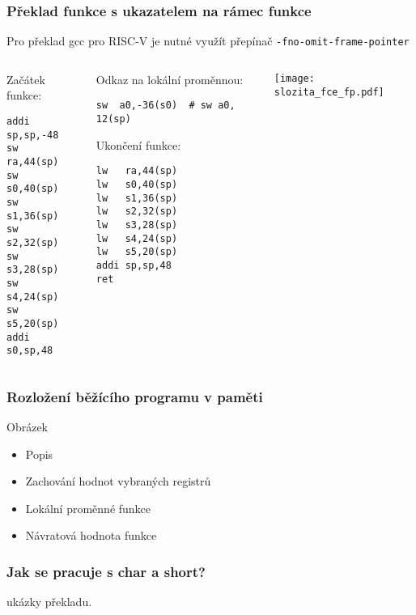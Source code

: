 \documentclass{beamer}
\begin{document}
\begin{frame}[fragile,shrink=5]
\frametitle{Překlad funkce s ukazatelem na rámec funkce}

Pro překlad gcc pro RISC-V je nutné využít přepínač \texttt{-fno-omit-frame-pointer}
\begin{columns}
\begin{column}{0.32\textwidth}
Začátek funkce:

\begin{verbatim}
addi sp,sp,-48
sw   ra,44(sp)
sw   s0,40(sp)
sw   s1,36(sp)
sw   s2,32(sp)
sw   s3,28(sp)
sw   s4,24(sp)
sw   s5,20(sp)
addi s0,sp,48
\end{verbatim}
\end{column}   
\begin{column}{0.32\textwidth}
Odkaz na lokální proměnnou:

\begin{verbatim}
sw	a0,-36(s0)  # sw a0, 12(sp)
\end{verbatim}


Ukončení funkce:

\begin{verbatim}
lw   ra,44(sp)
lw   s0,40(sp)
lw   s1,36(sp)
lw   s2,32(sp)
lw   s3,28(sp)
lw   s4,24(sp)
lw   s5,20(sp)
addi sp,sp,48
ret
\end{verbatim}
\end{column}
\begin{column}{0.35\textwidth}  
\texttt{[image: slozita\_fce\_fp.pdf]}
\end{column}
\end{columns}
\end{frame}



\begin{frame}
\frametitle{Rozložení běžícího programu v paměti}

Obrázek 

\begin{itemize}
 \item Popis 
 \item Zachování hodnot vybraných registrů
 \item Lokální proměnné funkce
 \item Návratová hodnota funkce
\end{itemize}
\end{frame}


\begin{frame}
\frametitle{Jak se pracuje s char a short?}

ukázky překladu.

\end{frame}
\end{document}
